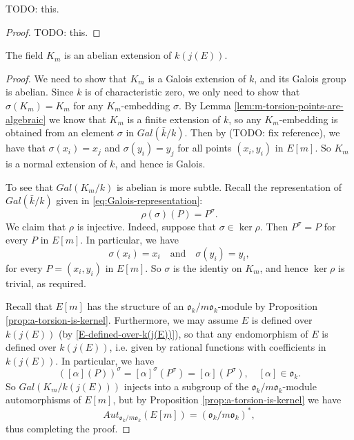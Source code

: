 \begin{lem}
  \label{lem:m-torsion-points-are-algebraic}
  TODO: this.
\end{lem}
\begin{proof}
  TODO: this.
\end{proof}

\begin{thm}
  \label{thm:K_m-is-abelian-over-k(j(E))}
  The field $K_{m}$ is an abelian extension of $k(j(E))$.
\end{thm}
\begin{proof}
  We need to show that $K_{m}$ is a Galois extension of $k$, and its Galois group is
  abelian.  Since $k$ is of characteristic zero, we only need to show that
  $\sigma(K_{m}) = K_{m}$ for any $K_{m}$-embedding $\sigma$.  By Lemma
  \ref{lem:m-torsion-points-are-algebraic} we know that $K_{m}$ is a finite extension
  of $k$, so any $K_{m}$-embedding is obtained from an element $\sigma$ in
  $Gal(\bar{k} / k)$.  Then by (TODO: fix reference), we have that $\sigma(x_{i}) =
  x_{j}$ and $\sigma(y_{i}) = y_{j}$ for all points $(x_{i},y_{i})$ in $E[m]$.  So
  $K_{m}$ is a normal extension of $k$, and hence is Galois.

  To see that $Gal(K_{m}/k)$ is abelian is more subtle.  Recall the representation of
  $Gal(\bar{k} / k)$ given in \eqref{eq:Galois-representation}:
  \begin{equation*}
    \rho (\sigma) (P) = P^{\sigma}.
  \end{equation*}
  We claim that $\rho$ is injective.  Indeed, suppose that $\sigma \in \ker{\rho}$.
  Then $P^{\sigma} = P$ for every $P$ in $E[m]$.  In particular, we have
  \begin{equation*}
    \sigma (x_{i}) = x_{i} \quad \text{and} \quad \sigma (y_{i}) = y_{i},
  \end{equation*}
  for every $P = (x_{i},y_{i})$ in $E[m]$.  So $\sigma$ is the identiy on $K_{m}$,
  and hence $\ker{\rho}$ is trivial, as required.

  Recall that $E[m]$ has the structure of an $\mathfrak{o}_{k} / m
  \mathfrak{o}_{k}$-module by Proposition \ref{prop:a-torsion-is-kernel}.
  Furthermore, we may assume $E$ is defined over $k(j(E))$ (by
  \eqref{E-defined-over-k(j(E))}), so that any endomorphism of $E$ is defined over
  $k(j(E))$, i.e. given by rational functions with coefficients in $k(j(E))$.  In
  particular, we have
  \begin{equation*}
    ([\alpha](P))^{\sigma} = [\alpha]^{\sigma}(P^{\sigma}) = [\alpha](P^{\sigma}),
    \quad [\alpha] \in \mathfrak{o}_{k}.
  \end{equation*}
  So $Gal(K_{m}/k(j(E)))$ injects into a subgroup of the $\mathfrak{o}_{k} / m
  \mathfrak{o}_{k}$-module automorphisms of $E[m]$, but by Proposition
  \ref{prop:a-torsion-is-kernel} we have
  \begin{equation*}
    Aut_{\mathfrak{o}_{k} / m \mathfrak{o}_{k}}(E[m]) = (\mathfrak{o}_{k} / m \mathfrak{o}_{k})^{*},
  \end{equation*}
  thus completing the proof.
\end{proof}
